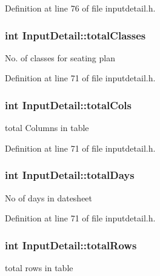 \-Definition at line 76 of file inputdetail.\-h.

\hypertarget{classInputDetail_aac4c49f5453d86c4c79bcb87361ad28d}{
\subsubsection[{total\-Classes}]{\setlength{\rightskip}{0pt plus 5cm}int {\bf \-Input\-Detail\-::total\-Classes}}}\label{db/d6e/classInputDetail_aac4c49f5453d86c4c79bcb87361ad28d}
\-No. of classes for seating plan 

\-Definition at line 71 of file inputdetail.\-h.

\hypertarget{classInputDetail_aeba19a14044746fd0c87b356d05d88c0}{
\subsubsection[{total\-Cols}]{\setlength{\rightskip}{0pt plus 5cm}int {\bf \-Input\-Detail\-::total\-Cols}}}\label{db/d6e/classInputDetail_aeba19a14044746fd0c87b356d05d88c0}
total \-Columns in table 

\-Definition at line 71 of file inputdetail.\-h.

\hypertarget{classInputDetail_a8d1ba029791bb9b87330400d82cdbcde}{
\subsubsection[{total\-Days}]{\setlength{\rightskip}{0pt plus 5cm}int {\bf \-Input\-Detail\-::total\-Days}}}\label{db/d6e/classInputDetail_a8d1ba029791bb9b87330400d82cdbcde}
\-No of days in datesheet 

\-Definition at line 71 of file inputdetail.\-h.

\hypertarget{classInputDetail_a3710702eafae009629e99f1dc76d5285}{
\subsubsection[{total\-Rows}]{\setlength{\rightskip}{0pt plus 5cm}int {\bf \-Input\-Detail\-::total\-Rows}}}\label{db/d6e/classInputDetail_a3710702eafae009629e99f1dc76d5285}
total rows in table 

